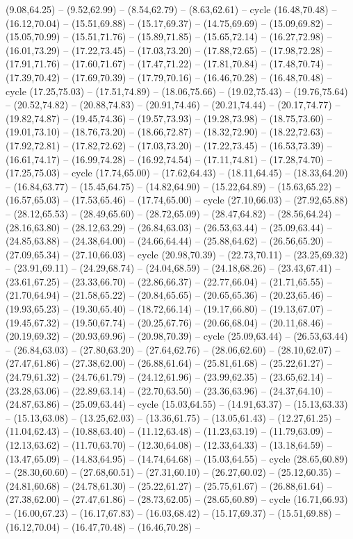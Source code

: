 {(9.08,64.25) -- (9.52,62.99) -- (8.54,62.79) -- (8.63,62.61) -- cycle (16.48,70.48) -- (16.12,70.04) -- (15.51,69.88) -- (15.17,69.37) -- (14.75,69.69) -- (15.09,69.82) -- (15.05,70.99) -- (15.51,71.76) -- (15.89,71.85) -- (15.65,72.14) -- (16.27,72.98) -- (16.01,73.29) -- (17.22,73.45) -- (17.03,73.20) -- (17.88,72.65) -- (17.98,72.28) -- (17.91,71.76) -- (17.60,71.67) -- (17.47,71.22) -- (17.81,70.84) -- (17.48,70.74) -- (17.39,70.42) -- (17.69,70.39) -- (17.79,70.16) -- (16.46,70.28) -- (16.48,70.48) -- cycle (17.25,75.03) -- (17.51,74.89) -- (18.06,75.66) -- (19.02,75.43) -- (19.76,75.64) -- (20.52,74.82) -- (20.88,74.83) -- (20.91,74.46) -- (20.21,74.44) -- (20.17,74.77) -- (19.82,74.87) -- (19.45,74.36) -- (19.57,73.93) -- (19.28,73.98) -- (18.75,73.60) -- (19.01,73.10) -- (18.76,73.20) -- (18.66,72.87) -- (18.32,72.90) -- (18.22,72.63) -- (17.92,72.81) -- (17.82,72.62) -- (17.03,73.20) -- (17.22,73.45) -- (16.53,73.39) -- (16.61,74.17) -- (16.99,74.28) -- (16.92,74.54) -- (17.11,74.81) -- (17.28,74.70) -- (17.25,75.03) -- cycle (17.74,65.00) -- (17.62,64.43) -- (18.11,64.45) -- (18.33,64.20) -- (16.84,63.77) -- (15.45,64.75) -- (14.82,64.90) -- (15.22,64.89) -- (15.63,65.22) -- (16.57,65.03) -- (17.53,65.46) -- (17.74,65.00) -- cycle (27.10,66.03) -- (27.92,65.88) -- (28.12,65.53) -- (28.49,65.60) -- (28.72,65.09) -- (28.47,64.82) -- (28.56,64.24) -- (28.16,63.80) -- (28.12,63.29) -- (26.84,63.03) -- (26.53,63.44) -- (25.09,63.44) -- (24.85,63.88) -- (24.38,64.00) -- (24.66,64.44) -- (25.88,64.62) -- (26.56,65.20) -- (27.09,65.34) -- (27.10,66.03) -- cycle (20.98,70.39) -- (22.73,70.11) -- (23.25,69.32) -- (23.91,69.11) -- (24.29,68.74) -- (24.04,68.59) -- (24.18,68.26) -- (23.43,67.41) -- (23.61,67.25) -- (23.33,66.70) -- (22.86,66.37) -- (22.77,66.04) -- (21.71,65.55) -- (21.70,64.94) -- (21.58,65.22) -- (20.84,65.65) -- (20.65,65.36) -- (20.23,65.46) -- (19.93,65.23) -- (19.30,65.40) -- (18.72,66.14) -- (19.17,66.80) -- (19.13,67.07) -- (19.45,67.32) -- (19.50,67.74) -- (20.25,67.76) -- (20.66,68.04) -- (20.11,68.46) -- (20.19,69.32) -- (20.93,69.96) -- (20.98,70.39) -- cycle (25.09,63.44) -- (26.53,63.44) -- (26.84,63.03) -- (27.80,63.20) -- (27.64,62.76) -- (28.06,62.60) -- (28.10,62.07) -- (27.47,61.86) -- (27.38,62.00) -- (26.88,61.64) -- (25.81,61.68) -- (25.22,61.27) -- (24.79,61.32) -- (24.76,61.79) -- (24.12,61.96) -- (23.99,62.35) -- (23.65,62.14) -- (23.28,63.06) -- (22.89,63.14) -- (22.70,63.50) -- (23.36,63.96) -- (24.37,64.10) -- (24.87,63.86) -- (25.09,63.44) -- cycle (15.03,64.55) -- (14.91,63.37) -- (15.13,63.33) -- (15.13,63.08) -- (13.25,62.03) -- (13.36,61.75) -- (13.05,61.43) -- (12.27,61.25) -- (11.04,62.43) -- (10.88,63.40) -- (11.12,63.48) -- (11.23,63.19) -- (11.79,63.09) -- (12.13,63.62) -- (11.70,63.70) -- (12.30,64.08) -- (12.33,64.33) -- (13.18,64.59) -- (13.47,65.09) -- (14.83,64.95) -- (14.74,64.68) -- (15.03,64.55) -- cycle (28.65,60.89) -- (28.30,60.60) -- (27.68,60.51) -- (27.31,60.10) -- (26.27,60.02) -- (25.12,60.35) -- (24.81,60.68) -- (24.78,61.30) -- (25.22,61.27) -- (25.75,61.67) -- (26.88,61.64) -- (27.38,62.00) -- (27.47,61.86) -- (28.73,62.05) -- (28.65,60.89) -- cycle (16.71,66.93) -- (16.00,67.23) -- (16.17,67.83) -- (16.03,68.42) -- (15.17,69.37) -- (15.51,69.88) -- (16.12,70.04) -- (16.47,70.48) -- (16.46,70.28) -- }
